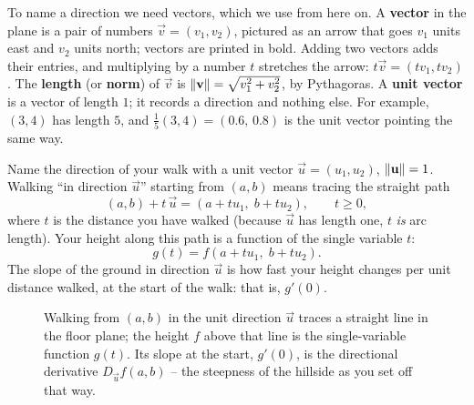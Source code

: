 To name a direction we need vectors, which we use from here on. A
\textbf{vector} in the plane is a pair of numbers $\vec v=(v_1,v_2)$, pictured as
an arrow that goes $v_1$ units east and $v_2$ units north; vectors are printed in
bold. Adding two vectors adds their entries, and multiplying by a number $t$
stretches the arrow: $t\vec v=(tv_1,tv_2)$. The \textbf{length} (or
\textbf{norm}) of $\vec v$ is $\lVert\mathbf{v}\rVert=\sqrt{v_1^2+v_2^2}$, by Pythagoras.
A \textbf{unit vector} is a vector of length $1$; it records a direction and
nothing else. For example, $(3,4)$ has length $5$, and $\tfrac15(3,4)=(0.6,\,0.8)$
is the unit vector pointing the same way.

Name the direction of your walk with a unit vector
$\vec{u}=(u_1,u_2)$, $\lVert\mathbf{u}\rVert=1$. Walking ``in direction $\vec u$''
starting from $(a,b)$ means tracing the straight path
\[
  (a,b) + t\,\vec u = (a + t u_1,\; b + t u_2), \qquad t \ge 0,
\]
where $t$ is the distance you have walked (because $\vec u$ has length one, $t$
\emph{is} arc length). Your height along this path is a function of the single
variable $t$:
\[
  g(t) = f(a + t u_1,\; b + t u_2).
\]
The slope of the ground in direction $\vec u$ is how fast your height changes per
unit distance walked, at the start of the walk: that is, $g'(0)$.

\begin{figure}[H]
\centering
{}
\caption{Walking from $(a,b)$ in the unit direction $\vec u$ traces a straight
line in the floor plane; the height $f$ above that line is the single-variable
function $g(t)$. Its slope at the start, $g'(0)$, is the directional derivative
$D_{\vec u}f(a,b)$ -- the steepness of the hillside as you set off that way.}
\label{ch33:fig-slice}
\end{figure}

